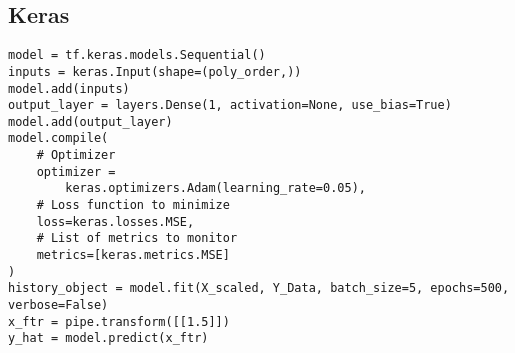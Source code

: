 \subsection{Keras}
\begin{lstlisting}[style=Python]
model = tf.keras.models.Sequential()
inputs = keras.Input(shape=(poly_order,))
model.add(inputs)
output_layer = layers.Dense(1, activation=None, use_bias=True)
model.add(output_layer)
model.compile(
    # Optimizer
    optimizer = 
        keras.optimizers.Adam(learning_rate=0.05),  
    # Loss function to minimize
    loss=keras.losses.MSE,
    # List of metrics to monitor
    metrics=[keras.metrics.MSE]
)
history_object = model.fit(X_scaled, Y_Data, batch_size=5, epochs=500, verbose=False)
x_ftr = pipe.transform([[1.5]]) 
y_hat = model.predict(x_ftr)
\end{lstlisting}
